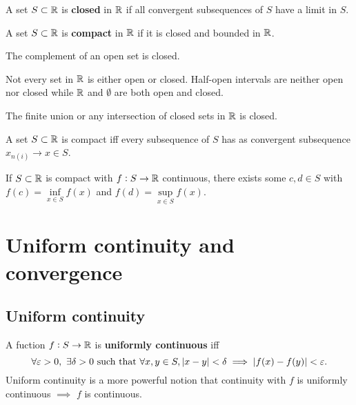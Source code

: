 \documentclass[../Year1.tex]{subfiles}
\begin{document}
\begin{definition}
    A set $S\subset\mathbb{R}$ is \textbf{closed} in $\mathbb{R}$ if all convergent subsequences of $S$ have a limit in $S$.
\end{definition}

\begin{definition}
    A set $S\subset\mathbb{R}$ is \textbf{compact} in $\mathbb{R}$ if it is closed and bounded in $\mathbb{R}$.
\end{definition}

\begin{theorem}
    The complement of an open set is closed.
\end{theorem}

\begin{remark}
    Not every set in $\mathbb{R}$ is either open or closed. Half-open intervals are neither open nor closed while $\mathbb{R}$ and $\emptyset$ are both open and closed.
\end{remark}

\begin{theorem}
    The finite union or any intersection of closed sets in $\mathbb{R}$ is closed.
\end{theorem}

\begin{theorem}
    A set $S\subset\mathbb{R}$ is compact iff every subsequence of $S$ has as convergent subsequence $x_{n(i)}\rightarrow x\in S$.
\end{theorem}

\begin{theorem}
    If $S\subset\mathbb{R}$ is compact with $f:S\rightarrow\mathbb{R}$ continuous, there exists some $c,d\in S$ with $f(c)=\inf\limits_{x\in S} f(x)$ and $f(d)=\sup\limits_{x\in S} f(x)$.
\end{theorem}

\section{Uniform continuity and convergence}

\subsection{Uniform continuity}

\begin{definition}
    A fuction $f:S\rightarrow\mathbb{R}$ is \textbf{uniformly continuous} iff \[
        \forall\epsilon>0, \ \exists\delta>0 \ \text{\textcolor{black}{such that }} \forall x,y\in S, |x-y|<\delta\implies|f(x)-f(y)|<\epsilon
        \textcolor{black}{.}
    \] Uniform continuity is a more powerful notion that continuity with $f$ is uniformly continuous $\implies$ $f$ is continuous.
\end{definition}
\end{document}

